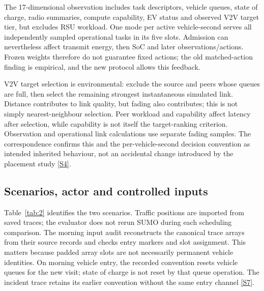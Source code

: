 \documentclass[11pt,a4paper]{article}
\begin{document}
The 17-dimensional observation includes task descriptors, vehicle queues, state of charge, radio summaries, compute capability, EV status and observed V2V target tier, but excludes RSU workload. One mode per active vehicle-second serves all independently sampled operational tasks in its five slots. Admission can nevertheless affect transmit energy, then SoC and later observations/actions. Frozen weights therefore do not guarantee fixed actions; the old matched-action finding is empirical, and the new protocol allows this feedback.

V2V target selection is environmental: exclude the source and peers whose queues are full, then select the remaining strongest instantaneous simulated link. Distance contributes to link quality, but fading also contributes; this is not simply nearest-neighbour selection. Peer workload and capability affect latency after selection, while capability is not itself the target-ranking criterion. Observation and operational link calculations use separate fading samples. The correspondence confirms this and the per-vehicle-second decision convention as intended inherited behaviour, not an accidental change introduced by the placement study \hyperref[source-s4]{[S4]}.

\subsection{Scenarios, actor and controlled inputs}\label{sec:2.3}

Table~\ref{tab:2} identifies the two scenarios. Traffic positions are imported from saved traces; the evaluator does not rerun SUMO during each scheduling comparison. The morning input audit reconstructs the canonical trace arrays from their source records and checks entry markers and slot assignment. This matters because padded array slots are not necessarily permanent vehicle identities. On morning vehicle entry, the recorded convention resets vehicle queues for the new visit; state of charge is not reset by that queue operation. The incident trace retains its earlier convention without the same entry channel \hyperref[source-s7]{[S7]}.
\end{document}
